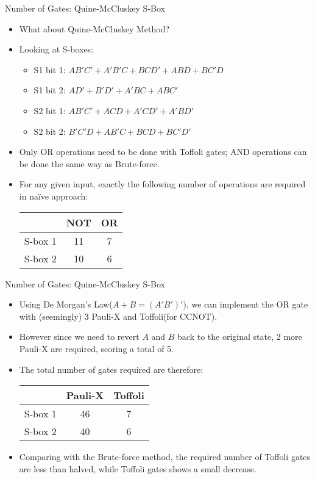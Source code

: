 \documentclass{beamer}
\begin{document}
	\begin{frame}{Number of Gates: Quine-McCluskey S-Box}
		\begin{itemize}
			\item What about Quine-McCluskey Method?
			\item Looking at S-boxes:
			\begin{itemize}
				\item S1 bit 1: $AB'C'+A'B'C+BCD'+ABD+BC'D$
				\item S1 bit 2: $AD'+B'D'+A'BC+ABC'$
				\item S2 bit 1: $AB'C'+ACD+A'CD'+A'BD'$
				\item S2 bit 2: $B'C'D+AB'C+BCD+BC'D'$
			\end{itemize}
			\item Only OR operations need to be done with Toffoli gates; AND operations can be done the same way as Brute-force.
			\item For any given input, exactly the following number of operations are required in naïve approach:
			\begin{center}
				\begin{tabular}{c|c|c}
					& NOT & OR \\\hline
					S-box 1 & 11      & 7      \\\hline
					S-box 2 & 10      & 6
				\end{tabular}
			\end{center}
		\end{itemize}
	\end{frame}
	
	\begin{frame}{Number of Gates: Quine-McCluskey S-Box}
		\begin{itemize}
			\item Using De Morgan's Law($A+B=(A'B')'$), we can implement the OR gate with (seemingly) 3 Pauli-X and Toffoli(for CCNOT).
			\item However since we need to revert $A$ and $B$ back to the original state, 2 more Pauli-X are required, scoring a total of 5.
			\item The total number of gates required are therefore:
			\begin{center}
				\begin{tabular}{c|c|c}
					& Pauli-X & Toffoli \\\hline
					S-box 1 & 46      & 7      \\\hline
					S-box 2 & 40      & 6
				\end{tabular}
			\end{center}
			\item Comparing with the Brute-force method, the required number of Toffoli gates are less than halved, while Toffoli gates shows a small decrease.
		\end{itemize}
	\end{frame}
	
\end{document}
